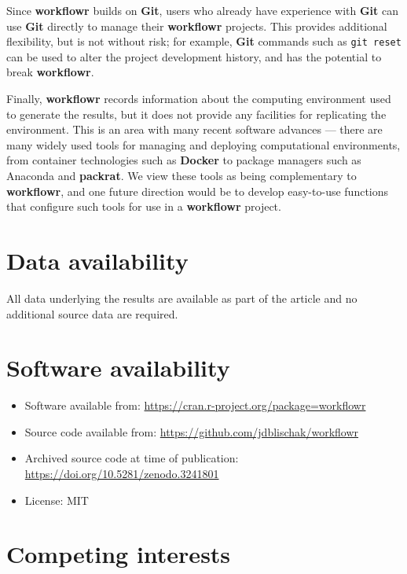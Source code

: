 \documentclass[9pt,a4paper]{extarticle}
\begin{document}
Since \textbf{workflowr} builds on \textbf{Git}, users who already have experience with
 \textbf{Git} can use \textbf{Git} directly to manage their \textbf{workflowr} projects. This
provides additional flexibility, but is not without risk; for example,
 \textbf{Git} commands such as \texttt{git reset} can be used to alter the project
development history, and has the potential to break \textbf{workflowr}.

Finally, \textbf{workflowr} records information about the computing environment
used to generate the results, but it does not provide any facilities for
replicating the environment. This is an area with many recent software
advances --- there are many widely used tools for managing and deploying
computational environments, from container technologies such as \textbf{Docker}
to package managers such as Anaconda and \textbf{packrat}. We view these tools as
being complementary to \textbf{workflowr}, and one future direction would be to
develop easy-to-use functions that configure such tools for use in a
 \textbf{workflowr} project.


\section*{Data availability}

All data underlying the results are available as part of the article and
no additional source data are required.


\section*{Software availability}

\begin{itemize}

\item Software available from:
\url{https://cran.r-project.org/package=workflowr}

\item Source code available from:
\url{https://github.com/jdblischak/workflowr}

\item Archived source code at time of publication:
\url{https://doi.org/10.5281/zenodo.3241801}
\cite{john_blischak_2019_3241801}

\item License: MIT

\end{itemize}


\section*{Competing interests}
\end{document}
